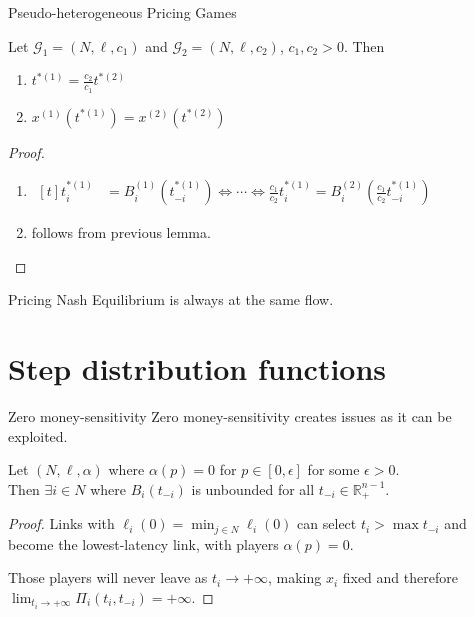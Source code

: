 \documentclass{beamer}
\newcommand{\R}{\mathbb{R}}
\newcommand{\Gm}{\mathcal{G}}
\begin{document}
\begin{frame}{Pseudo-heterogeneous Pricing Games}
	\begin{lemma}
		Let $\Gm_1 = (N, \ell, c_1)$ and $\Gm_2 = (N, \ell, c_2)$, $c_1, c_2 > 0$.
		Then
		\begin{enumerate}[$(i)$]
			\item $t^{*(1)} = \frac{c_2}{c_1} t^{*(2)}$
			\item $x^{(1)}(t^{*(1)}) = x^{(2)}(t^{*(2)})$
		\end{enumerate}
	\end{lemma}
	\begin{proof}
		\begin{enumerate}[$(i)$]
			\item
			$\begin{aligned}[t]
				t_i^{*(1)} &= B_i^{(1)}(t_{-i}^{*(1)}) \Leftrightarrow \cdots \Leftrightarrow \frac{c_1}{c_2} t_i^{*(1)} = B_i^{(2)}\left(\frac{c_1}{c_2} t_{-i}^{*(1)}\right)
			\end{aligned}$
			\item follows from previous lemma.
			\vspace{-20pt}
		\end{enumerate}
	\end{proof}
	Pricing Nash Equilibrium is always at the same flow.
\end{frame}

\section{Step distribution functions}

\begin{frame}{Zero money-sensitivity}
	Zero money-sensitivity creates issues as it can be exploited.
	\begin{lemma}
		Let $(N, \ell, \alpha)$ where $\alpha(p) = 0$ for $p \in [0, \epsilon]$ for some $\epsilon > 0$.\\
		Then $\exists i \in N$ where $B_i(t_{-i})$ is unbounded for all $t_{-i} \in \R_+^{n - 1}$.
	\end{lemma}
	\begin{proof}
		Links with $\ell_i(0) = \min_{j \in N} \ell_i(0)$ can select $t_i > \max t_{-i}$ and become the lowest-latency link, with players $\alpha(p) = 0$.

		Those players will never leave as $t_i \rightarrow +\infty$, making $x_i$ fixed and therefore $\lim_{t_i \rightarrow +\infty} \Pi_i(t_i, t_{-i}) = +\infty$.
	\end{proof}
\end{frame}
\end{document}
